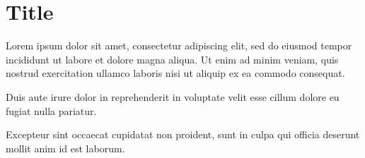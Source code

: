 \section{Title}
Lorem ipsum dolor sit amet, consectetur adipiscing elit, sed do eiusmod tempor incididunt ut labore et dolore magna aliqua. Ut enim ad minim veniam, quis nostrud exercitation ullamco laboris nisi ut aliquip ex ea commodo consequat.

\begin{center}
    Duis aute irure dolor in reprehenderit in voluptate velit esse cillum dolore eu fugiat nulla pariatur.
\end{center}

Excepteur sint occaecat cupidatat non proident, sunt in culpa qui officia deserunt mollit anim id est laborum.
